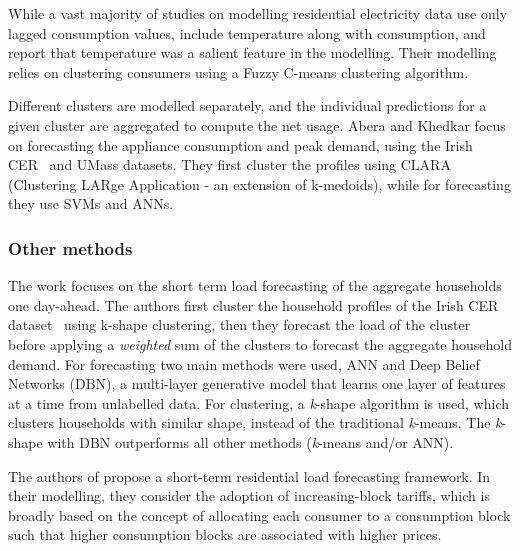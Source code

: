 While a vast majority of studies on modelling residential electricity data use only lagged consumption values, \cite{Fu2018csl} include temperature along with consumption, and report that temperature was a salient feature in the modelling. Their modelling relies on clustering consumers using a Fuzzy C-means clustering algorithm. 

Different clusters are modelled separately, and the individual predictions for a given cluster are aggregated to compute the net usage. 
Abera and Khedkar \cite{abera2020mla} focus on forecasting the appliance consumption and peak demand, using the Irish CER~\cite{Commission2012csm} and UMass datasets. They first cluster the profiles using CLARA (Clustering LARge Application - an extension of k-medoids), while for forecasting they use SVMs and ANNs. 


\subsubsection{Other methods}
The work \cite{fahiman2017ilf} focuses on the short term load forecasting of the aggregate households one day-ahead. The authors first cluster the household profiles of the Irish CER dataset~\cite{Commission2012csm} using k-shape clustering, then they forecast the load of the cluster before applying a \textit{weighted} sum of the clusters to forecast the aggregate household demand. For forecasting two main methods were used, ANN and Deep Belief Networks (DBN), a multi-layer generative model that learns one layer of features at a time from unlabelled data.
For clustering, a \textit{k}-shape algorithm is used, which clusters households with similar shape, instead of the traditional \textit{k}-means. 
The \textit{k}-shape with DBN outperforms all other methods (\textit{k}-means and/or ANN).

The authors of \cite{Fu2018csl} propose a short-term residential load forecasting framework. In their modelling, they consider the adoption of increasing-block tariffs, which is broadly based on the concept of allocating each consumer to a consumption block such that higher consumption blocks are associated with higher prices. 

